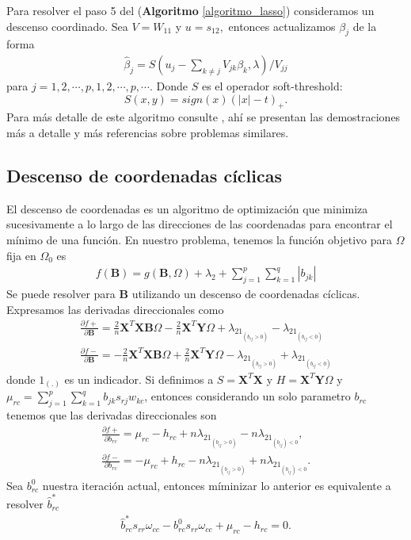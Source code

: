\documentclass{article}
\newcommand{\X}{\mathbf{X}}
\newcommand{\Y}{\mathbf{Y}}
\newcommand{\B}{\mathbf{B}}
\begin{document}
Para resolver el paso 5 del (\textbf{Algoritmo} \ref{algoritmo_lasso}) consideramos un descenso coordinado. Sea $V=W_{11}$ y $u=s_{12},$ entonces actualizamos $\beta_j$ de la forma
\begin{align}
    \hat{\beta}_j = S(u_j- \sum_{k\neq j} V_{jk}\beta_k, \lambda) /V_{jj}
\end{align}
para $j=1,2,\cdots, p, 1,2, \cdots, p, \cdots.$ Donde $S$ es el operador soft-threshold:
$$S(x,y)=sign (x)(|x|-t)_+.$$
Para más detalle de este algoritmo consulte \cite{friedman_sparse_2008}, ahí se presentan las demostraciones más a detalle y más referencias sobre problemas similares. 

\subsection{Descenso de coordenadas cíclicas}
\label{descenso_coo}
El descenso de coordenadas es un algoritmo de optimización que minimiza sucesivamente a lo largo de las direcciones de las coordenadas para encontrar el mínimo de una función. En nuestro problema, tenemos la función objetivo para $\Omega$ fija en $\Omega_0$ es
\begin{align}
    f(\B)=g(\B,\Omega)+\lambda_2+\sum_{j=1}^p\sum_{k=1}^q |b_{jk}|
\end{align}
Se puede resolver para $\B$ utilizando un descenso de coordenadas cíclicas. Expresamos las derivadas direccionales como
\begin{align}
    \frac{\partial f+}{\partial\B} = \frac{2}{n}\X^T\X\B\Omega-\frac{2}{n}\X^T\Y\Omega+\lambda_21_{(b_{ij}>0)}-\lambda_21_{(b_{ij}<0)}\\
    \frac{\partial f-}{\partial\B} = -\frac{2}{n}\X^T\X\B\Omega+\frac{2}{n}\X^T\Y\Omega-\lambda_21_{(b_{ij}>0)}+\lambda_21_{(b_{ij}<0)}
\end{align}
donde $1_{(.)}$ es un indicador. Si definimos a $S=\X^T\X$ y $H=\X^T\Y\Omega$ y $\mu_{rc}=\sum_{j=1}^p\sum_{k=1}^q b_{jk}s_{rj}w_{kc}$, entonces considerando un solo parametro $b_{rc}$ tenemos que las derivadas direccionales son
\begin{align*}
    \frac{\partial f+}{\partial b_{rc}} = \mu_{rc}-h_{rc}+n\lambda_21_{(b_{ij}>0)}-n\lambda_21_{(b_{ij})<0},\\
     \frac{\partial f-}{\partial b_{rc}} = -\mu_{rc}+h_{rc}-n\lambda_21_{(b_{ij}>0)}+n\lambda_21_{(b_{ij})<0}.
\end{align*}
Sea $b_{rc}^0$ nuestra iteración actual, entonces míminizar lo anterior es equivalente a resolver $\hat{b}_{rc}^*$
\begin{align*}
    \hat{b}_{rc}^*s_{rr}\omega_{cc}-b^0_{rc}s_{rr}\omega_{cc}+\mu_{rc}-h_{rc}=0.
\end{align*}
\end{document}
